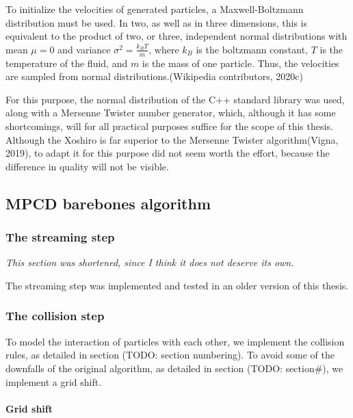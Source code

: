 \documentclass[
]{article}
\begin{document}
To initialize the velocities of generated particles, a Maxwell-Boltzmann
distribution must be used. In two, as well as in three dimensions, this
is equivalent to the product of two, or three, independent normal
distributions with mean \(\mu = 0\) and variance
\(\sigma^2 = \frac{k_{B}T}{m}\), where \(k_{B}\) is the boltzmann
constant, \(T\) is the temperature of the fluid, and \(m\) is the mass
of one particle. Thus, the velocities are sampled from normal
distributions.(Wikipedia contributors, 2020c)

For this purpose, the normal distribution of the C++ standard library
was used, along with a Mersenne Twister number generator, which,
although it has some shortcomings, will for all practical purposes
suffice for the scope of this thesis. Although the Xoshiro is far
superior to the Mersenne Twister algorithm(Vigna, 2019), to adapt it for
this purpose did not seem worth the effort, because the difference in
quality will not be visible.

\hypertarget{mpcd-barebones-algorithm}{%
\subsection{MPCD barebones algorithm}\label{mpcd-barebones-algorithm}}

\hypertarget{the-streaming-step-1}{%
\subsubsection{The streaming step}\label{the-streaming-step-1}}

\emph{This section was shortened, since I think it does not deserve its
own.}

The streaming step was implemented and tested in an older version of
this thesis.

\hypertarget{the-collision-step-1}{%
\subsubsection{The collision step}\label{the-collision-step-1}}

To model the interaction of particles with each other, we implement the
collision rules, as detailed in section (TODO: section numbering). To
avoid some of the downfalls of the original algorithm, as detailed in
section (TODO: section\#), we implement a grid shift.

\hypertarget{grid-shift}{%
\paragraph{Grid shift}\label{grid-shift}}
\end{document}
